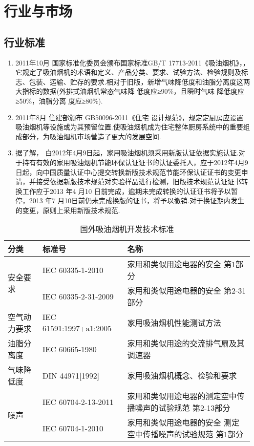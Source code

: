 ﻿\section{行业与市场}
\subsection{行业标准}
\begin{enumerate}
\item 2011年10月 国家标准化委员会颁布国家标准GB/T 17713-2011《吸油烟机》，，它规定了吸油烟机的术语和定义、产品分类、要求、试验方法、检验规则及标志、包装、运输、贮存的要求.相对于旧版，新增气味降低度和油脂分离度这两大指标的数据(外排式油烟机常态气味降 低度应≥90\%，且瞬时气味 降低度应≥50\%，油脂分离 度应≥80\%).
\item 2011年8月 住建部颁布 GB50096-2011《住宅 设计规范》，规定定厨房应设置吸油烟机等设施或为其预留位置.使吸油烟机成为住宅整体厨房系统中的重要组成部分，为吸油烟机市场营造了更大的发展空间.
\item 据了解， 白2012年4月9日起，家用吸油烟机须采用新版认证依据实施认证.对于持有有效的家用吸油烟机节能环保认证证书的认证委托人，应于2012年4月9日起，向中国质量认证中心提交转换新版技术规范节能环保认证证书的变更申请，并接受依据新版技术规范对实验样品进行检测，旧版技术规范认证证书转换工作应于2013 年4 月10 日前完成，逾期未完成转换的认证证书将予以暂停，2013 年7 月10日前仍未完成换版的证书，将予以撤销.对于换证期内发生的变更，原则上采用新版技术规范.
\end{enumerate}

{\footnotesize{\begin{longtable}{l|l|l}
\caption{国外吸油烟机开发技术标准}  \\
\hline
分类 & 标准号 & 名称 \\
\hline
\multirow{2}{*}{安全要求} & IEC 60335-1-2010 & 家用和类似用途电器的安全 第1部分 \\
\cline{2-3}
 & IEC 60335-2-31-2009 & 家用和类似用途电器的安全 第2-31 部分  \\
 \hline
空气动力要求  & IEC 61591:1997+a1:2005 & 家用吸油烟机性能测试方法  \\
\cline{2-3}
油脂分离度 & IEC 60665-1980 & 家用和类似用途的交流排气扇及其调速器\\
\cline{2-3}
气味降低度 & DIN 44971[1992] & 家用吸油烟机概念、检验和要求\\
 \hline
\multirow{2}{*}{噪声} & IEC 60704-2-13-2011 & 家用和类似用途电器的测定空中传播噪声的试验规范 第2-13部分 \\
\cline{2-3}
 & IEC 60704-1-2010 & 家用和类似用途电器的安全 测定空中传播噪声的试验规范 第1部分  \\
\hline
\end{longtable}}}

